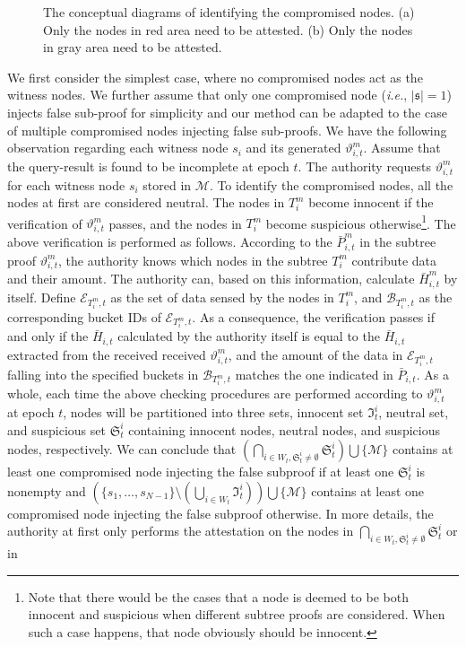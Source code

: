 \documentclass[conference]{IEEEtran}
\begin{document}
\begin{figure}[h]
\centering
{}
\caption{\scriptsize The conceptual diagrams of identifying the compromised nodes. (a) Only the nodes in red area need to be attested. (b) Only the nodes in gray area need to be attested.} \label{fig: diagram}
\end{figure}

We first consider the simplest case, where no compromised nodes act as the witness nodes. We further assume that only one compromised node (\emph{i.e.}, $|\mathfrak{s}|=1$) injects false sub-proof for simplicity and our method can be adapted to the case of multiple compromised nodes injecting false sub-proofs. We have the following observation regarding each witness node $s_i$ and its generated $\vartheta_{i,t}^m$. Assume that the query-result is found to be incomplete at epoch $t$. The authority requests $\vartheta_{i,t}^m$ for each witness node $s_i$ stored in $\mathcal{M}$. To identify the compromised nodes, all the nodes at first are considered neutral. The nodes in $T_i^m$ become innocent if the verification of $\vartheta_{i,t}^m$ passes, and the nodes in $T_i^m$ become suspicious otherwise\footnote{Note that there would be the cases that a node is deemed to be both innocent and suspicious when different subtree proofs are considered. When such a case happens, that node obviously should be innocent.}. The above verification is performed as follows. According to the $\bar{P}_{i,t}^m$ in the subtree proof $\vartheta_{i,t}^m$, the authority knows which nodes in the subtree $T_i^m$ contribute data and their amount. The authority can, based on this information, calculate $\bar{H}_{i,t}^m$ by itself. Define $\mathcal{E}_{T_i^m,t}$ as the set of data sensed by the nodes in $T_i^m$, and $\mathcal{B}_{T_i^m,t}$ as the corresponding bucket IDs of $\mathcal{E}_{T_i^m,t}$. As a consequence, the verification passes if and only if the $\bar{H}_{i,t}$ calculated by the authority itself is equal to the $\bar{H}_{i,t}$ extracted from the received received $\vartheta_{i,t}^m$, and the amount of the data in $\mathcal{E}_{T_i^m,t}$ falling into the specified buckets in $\mathcal{B}_{T_i^m,t}$ matches the one indicated in $\bar{P}_{i,t}$. As a whole, each time the above checking procedures are performed according to $\vartheta_{i,t}^m$ at epoch $t$, nodes will be partitioned into three sets, innocent set $\mathfrak{I}_t^i$, neutral set, and suspicious set $\mathfrak{S}_t^i$ containing innocent nodes, neutral nodes, and suspicious nodes, respectively. We can conclude that $(\bigcap_{i\in W_t,\mathfrak{S}_t^i\neq \emptyset}\mathfrak{S}_t^i)\bigcup\{\mathcal{M}\}$ contains at least one compromised node injecting the false subproof if at least one $\mathfrak{S}_t^i$ is nonempty and $(\{s_1,\dots,s_{N-1}\}\setminus(\bigcup_{i\in W_t}\mathfrak{I}_t^i))\bigcup\{\mathcal{M}\}$ contains at least one compromised node injecting the false subproof otherwise. In more details, the authority at first only performs the attestation \cite{slpdk06,smkk05,spdk04} on the nodes in $\bigcap_{i\in W_t,\mathfrak{S}_t^i\neq \emptyset}\mathfrak{S}_t^i$ or in 
\end{document}
